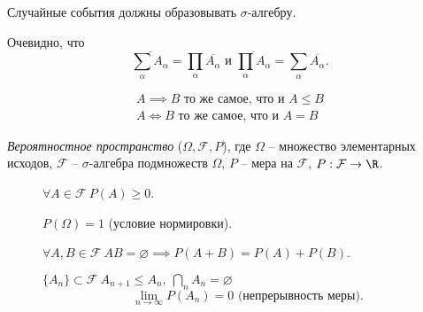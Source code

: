 \begin{remark}
  Случайные события должны образовывать $\sigma$-алгебру.
\end{remark}

\begin{remark}
  Очевидно, что 
  \[
    \overline{\sum_{\alpha}A_{\alpha}}=\prod_{\alpha}\overline{A_{\alpha}} \text{ и } \overline{\prod_{\alpha}A_{\alpha}} = \sum_{\alpha}\overline{A_{\alpha}}.
  \]
\end{remark}

\begin{remark}
  \[
    \begin{array}{c}
      A \implies B \text{ то же самое, что и } A \leqslant B \\
      A \iff B \text{ то же самое, что и } A = B
    \end{array}
  \]
\end{remark}

\begin{definition}
  \emph{Вероятностное пространство} ($\Omega,\mathcal{F},P$), где $\Omega$ -- множество элементарных исходов, $\mathcal{F}$ -- $\sigma$-алгебра подмножеств $\Omega$, $P$ -- мера на $\mathcal{F}$, $P: \mathcal{F} \rightarrow \R $.
  \begin{description}
    \item[] $\forall A \in \mathcal{F} \ P(A) \geqslant 0$.
    \item[] $P(\Omega) = 1$ (условие нормировки). 
    \item[] $\forall A,B \in \mathcal{F} \ AB = \varnothing \implies P(A+B) = P(A) + P(B)$.
    \item[] $\{A_{n}\}\subset \mathcal{F} \ A_{n+1} \leqslant A_n, \ \bigcap_n A_n = \varnothing$
    \[
      \lim_{n \rightarrow \infty}P(A_n) = 0 \text{ (непрерывность меры)}. 
    \]
  \end{description}
\end{definition}

